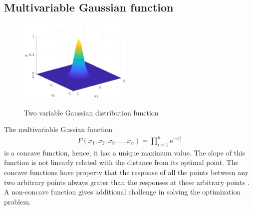 \documentclass[twocolumn]{svjour3}          %
\newcommand{\me}{\mathrm{e}}
\begin{document}
\subsection{Multivariable Gaussian function}
\begin{figure}
	\centering
	\includegraphics[width=0.48\textwidth]{images/2GussianFunction}
	\label{Fig:TwoVarGaussian}
	\caption{Two variable Gaussian distribution function}
\end{figure}
The multivariable Gussian function
\begin{eqnarray}
	F(x_1, x_2, x_3, \dots, x_n) = \prod_{i=1}^{n}{\me^{-x_i^2}} \label{Eqn:MultiFactorialNormal}
\end{eqnarray}
is a concave function, hence, it has a unique maximum value. The slope of this function is not linearly related with the distance from its optimal point. The concave functions have property that the response of all the points between any two arbitrary points always grater than the responses at these arbitrary points \cite{antoniou2007practical}. A non-concave function gives additional challenge in solving the optimization problem. 
\end{document}
